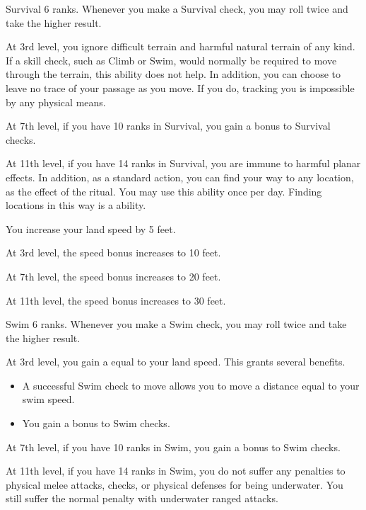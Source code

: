     \featpre Survival 6 ranks.
    \featben Whenever you make a Survival check, you may roll twice and take the higher result.

    At 3rd level, you ignore difficult terrain and harmful natural terrain of any kind.
    If a skill check, such as Climb or Swim, would normally be required to move through the terrain, this ability does not help.
    In addition, you can choose to leave no trace of your passage as you move.
    If you do, tracking you is impossible by any physical means.

    At 7th level, if you have 10 ranks in Survival, you gain a  bonus to Survival checks.

    At 11th level, if you have 14 ranks in Survival, you are immune to harmful planar effects.
    In addition, as a standard action, you can find your way to any location, as the effect of the  ritual.
    You may use this ability once per day.
    Finding locations in this way is a  ability.

    \featben You increase your land speed by 5 feet.

    At 3rd level, the speed bonus increases to 10 feet.

    At 7th level, the speed bonus increases to 20 feet.

    At 11th level, the speed bonus increases to 30 feet.

    \featpre Swim 6 ranks.
    \featben Whenever you make a Swim check, you may roll twice and take the higher result.

    At 3rd level, you gain a  equal to your land speed.
    This grants several benefits.
    \begin{itemize}
        \item A successful Swim check to move allows you to move a distance equal to your swim speed.
        \item You gain a  bonus to Swim checks.
    \end{itemize}

    At 7th level, if you have 10 ranks in Swim, you gain a  bonus to Swim checks.

    At 11th level, if you have 14 ranks in Swim, you do not suffer any penalties to physical melee attacks, checks, or physical defenses for being underwater.
    You still suffer the normal penalty with underwater ranged attacks.

